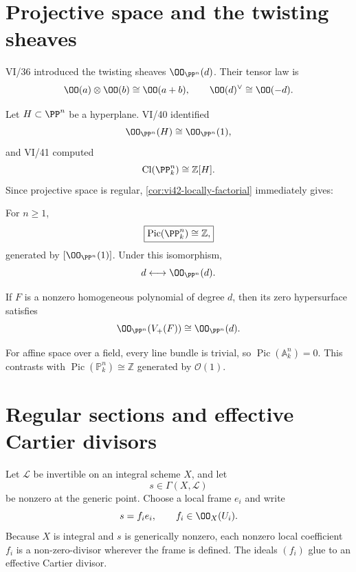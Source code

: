 \section{Projective space and the twisting sheaves}

VI/36 introduced the twisting sheaves \(\OO_{\PP^n}(d)\).  Their tensor law is
\[
  \OO(a)\otimes\OO(b)\cong\OO(a+b),
\qquad
  \OO(d)^\vee\cong\OO(-d).
\]

Let \(H\subset\PP^n\) be a hyperplane.  VI/40 identified
\[
  \OO_{\PP^n}(H)\cong\OO_{\PP^n}(1),
\]
and VI/41 computed
\[
  \Cl(\PP^n_k)\cong\mathbb Z[H].
\]
Since projective space is regular, \cref{cor:vi42-locally-factorial} immediately gives:

\begin{theorem}\label{thm:vi42-pic-projective-space}
For \(n\ge1\),
\[
  \boxed{
  \Pic(\PP^n_k)\cong\mathbb Z,
  }
\]
generated by \([\OO_{\PP^n}(1)]\).  Under this isomorphism,
\[
  d\longleftrightarrow\OO_{\PP^n}(d).
\]
\end{theorem}

If \(F\) is a nonzero homogeneous polynomial of degree \(d\), then its zero hypersurface satisfies
\[
  \OO_{\PP^n}(V_+(F))\cong\OO_{\PP^n}(d).
\]



\begin{example}\label{ex:vi42-expand-03}
For affine space over a field, every line bundle is trivial, so $\operatorname{Pic}(\mathbb A^n_k)=0$.  This contrasts with $\operatorname{Pic}(\mathbb P^n_k)\cong\mathbb Z$ generated by $\mathcal O(1)$.
\end{example}
\section{Regular sections and effective Cartier divisors}

Let \(\mathcal L\) be invertible on an integral scheme \(X\), and let
\[
  s\in\Gamma(X,\mathcal L)
\]
be nonzero at the generic point.  Choose a local frame \(e_i\) and write
\[
  s=f_i e_i,
  \qquad
  f_i\in\OO_X(U_i).
\]
Because \(X\) is integral and \(s\) is generically nonzero, each nonzero local coefficient \(f_i\) is a non-zero-divisor wherever the frame is defined.  The ideals \((f_i)\) glue to an effective Cartier divisor.

